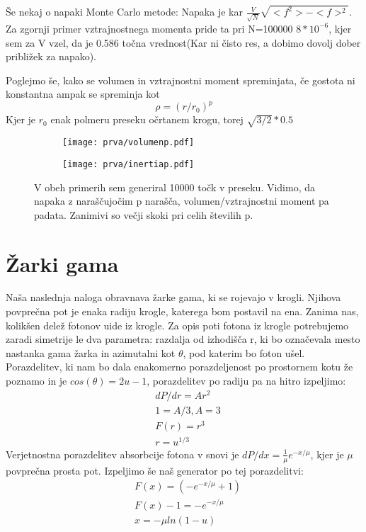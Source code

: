 \documentclass{article}
\begin{document}
Še nekaj o napaki Monte Carlo metode: Napaka je kar $\frac{V}{\sqrt{N}} \sqrt{<f^2> - <f>^2}$. Za zgornji primer vztrajnostnega momenta pride ta pri N=100000 $8*10^{-6}$, kjer sem za V vzel, da je 0.586 točna vrednost(Kar ni čisto res, a dobimo dovolj dober približek za napako).

Poglejmo še, kako se volumen in vztrajnostni moment spreminjata, če gostota ni konstantna ampak se spreminja kot
\begin{equation*}
\rho = (r/r_0)^p
\end{equation*}
Kjer je $r_0$ enak polmeru preseku očrtanem krogu, torej $\sqrt{3/2}*0.5$

\begin{figure}[H]
\centering
\begin{subfigure}{.49\textwidth}
\texttt{[image: prva/volumenp.pdf]}
\end{subfigure}
\begin{subfigure}{.49\textwidth}
\texttt{[image: prva/inertiap.pdf]}
\end{subfigure}
\caption*{V obeh primerih sem generiral 10000 točk v preseku. Vidimo, da napaka z naraščujočim p narašča, volumen/vztrajnostni moment pa padata. Zanimivi so večji skoki pri celih številih p.}
\end{figure}

\section{Žarki gama}

Naša naslednja naloga obravnava žarke gama, ki se rojevajo v krogli. Njihova povprečna pot je enaka radiju krogle, katerega bom postavil na ena. Zanima nas, kolikšen delež fotonov uide iz krogle.
Za opis poti fotona iz krogle potrebujemo zaradi simetrije le dva parametra: razdalja od izhodišča r, ki bo označevala mesto nastanka gama žarka in azimutalni kot $\theta$, pod katerim bo foton ušel.
Porazdelitev, ki nam bo dala enakomerno porazdeljenost po prostornem kotu že poznamo in je $cos(\theta) = 2u - 1$, porazdelitev po radiju pa na hitro izpeljimo:
\begin{align*}
&dP/dr = A r^2 \\
& 1 = A/3 , A = 3 \\
&F(r) = r^3 \\
&r = u^{1/3}
\end{align*}
Verjetnostna porazdelitev absorbcije fotona v snovi je $dP/dx = \frac{1}{\mu} e^{-x/\mu}$, kjer je $\mu$ povprečna prosta pot. Izpeljimo še naš generator po tej porazdelitvi:
\begin{align*}
&F(x) = (- e^{-x/\mu} + 1) \\
&F(x) - 1 = - e^{-x/\mu} \\
&x = -\mu ln(1-u)
\end{align*}
\end{document}
